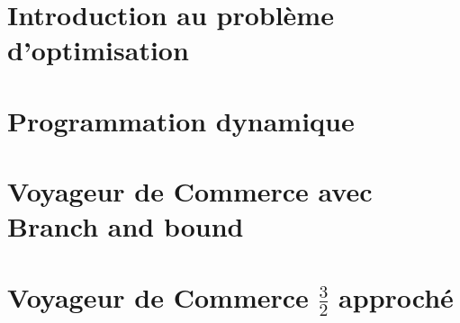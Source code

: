 \section{Introduction au problème d'optimisation}


\section{Programmation dynamique}


\pagebreak

\section{Voyageur de Commerce avec Branch and bound}


\section{Voyageur de Commerce $\frac{3}{2}$ approché}

